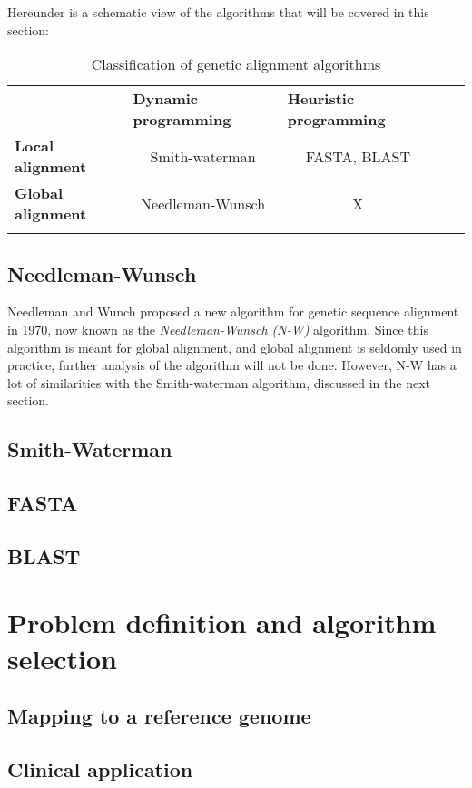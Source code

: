 Hereunder is a schematic view of the algorithms that will be covered in this section:

\begin{table}[H]
\begin{tabular}{lllll}
	\cline{1-3}
	\multicolumn{1}{|l|}{}                          & \multicolumn{1}{l|}{\textbf{Dynamic programming}} & \multicolumn{1}{l|}{\textbf{Heuristic programming}} &  &  \\ \cline{1-3}
	\multicolumn{1}{|l|}{\textbf{Local alignment}}  & \multicolumn{1}{c|}{Smith-waterman}               & \multicolumn{1}{c|}{FASTA, BLAST}                   &  &  \\ \cline{1-3}
	\multicolumn{1}{|l|}{\textbf{Global alignment}} & \multicolumn{1}{c|}{Needleman-Wunsch}             & \multicolumn{1}{c|}{X}                              &  &  \\ \cline{1-3}
	&                                                   &                                                     &  & 
\end{tabular}
\caption{Classification of genetic alignment algorithms}
\end{table}
 

\subsection{Needleman-Wunsch}
Needleman and Wunch proposed a new algorithm for genetic sequence alignment in 1970, now known as the \emph{Needleman-Wunsch (N-W)} algorithm. Since this algorithm is meant for global alignment, and global alignment is seldomly used in practice, further analysis of the algorithm will not be done. However, N-W has a lot of similarities with the Smith-waterman algorithm, discussed in the next section.

\subsection{Smith-Waterman}

\subsection{FASTA}

\subsection{BLAST}

\section{Problem definition and algorithm selection}

\subsection{Mapping to a reference genome}

\subsection{Clinical application}